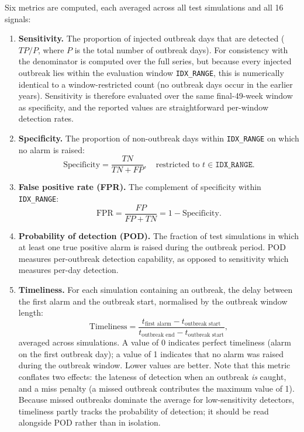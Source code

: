 \documentclass[11pt]{article}
\begin{document}
Six metrics are computed, each averaged across all test simulations and all 16 signals:

\begin{enumerate}
\item \textbf{Sensitivity.} The proportion of injected outbreak days that are detected ($TP / P$, where $P$ is the total number of outbreak days). For consistency with \citet{noufaily2019} the denominator is computed over the full series, but because every injected outbreak lies within the evaluation window \texttt{IDX\_RANGE}, this is numerically identical to a window-restricted count (no outbreak days occur in the earlier years). Sensitivity is therefore evaluated over the same final-49-week window as specificity, and the reported values are straightforward per-window detection rates.

\item \textbf{Specificity.} The proportion of non-outbreak days within \texttt{IDX\_RANGE} on which no alarm is raised:
\[
\text{Specificity} = \frac{TN}{TN + FP}, \quad \text{restricted to } t \in \texttt{IDX\_RANGE}.
\]

\item \textbf{False positive rate (FPR).} The complement of specificity within \texttt{IDX\_RANGE}:
\[
\text{FPR} = \frac{FP}{FP + TN} = 1 - \text{Specificity}.
\]

\item \textbf{Probability of detection (POD).} The fraction of test simulations in which at least one true positive alarm is raised during the outbreak period. POD measures per-outbreak detection capability, as opposed to sensitivity which measures per-day detection.

\item \textbf{Timeliness.} For each simulation containing an outbreak, the delay between the first alarm and the outbreak start, normalised by the outbreak window length:
\[
\text{Timeliness} = \frac{t_{\text{first alarm}} - t_{\text{outbreak start}}}{t_{\text{outbreak end}} - t_{\text{outbreak start}}},
\]
averaged across simulations. A value of 0 indicates perfect timeliness (alarm on the first outbreak day); a value of 1 indicates that no alarm was raised during the outbreak window. Lower values are better. Note that this metric conflates two effects: the lateness of detection when an outbreak \textit{is} caught, and a miss penalty (a missed outbreak contributes the maximum value of 1). Because missed outbreaks dominate the average for low-sensitivity detectors, timeliness partly tracks the probability of detection; it should be read alongside POD rather than in isolation.


\end{enumerate}
\end{document}
